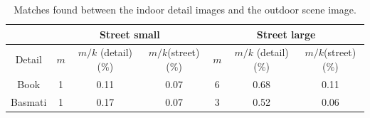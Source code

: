 \documentclass{article}
\begin{document}
\begin{table}[H]
\centering
 \caption{Matches found between the indoor detail images and the outdoor scene image.}
 \label{table3}
 \begin{tabular}{|c|c|c|c||c|c|c|}
 \hline
 & \multicolumn{3}{c||}{Street small} & \multicolumn{3}{c|}{Street large} \\
 \hline
  Detail & $m$ & $m/k$ (detail) ($\%$) & $m/k$(street) ($\%$) & $m$ & $m/k$ (detail) ($\%$) & $m/k$(street) ($\%$) \\
  \hline
  Book & 1 & 0.11 & 0.07 & 6 & 0.68 & 0.11 \\
  Basmati & 1 & 0.17 & 0.07 & 3 & 0.52 & 0.06 \\
  \hline
 \end{tabular}
\end{table}

\end{document}
